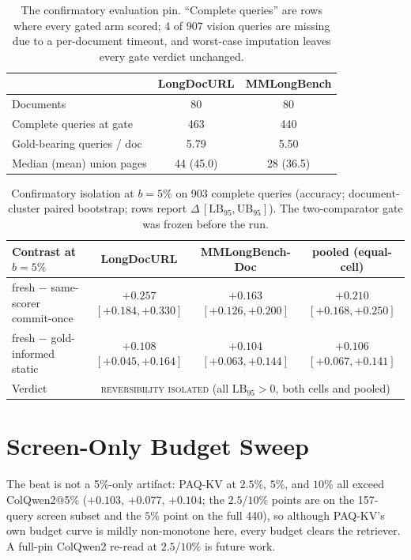 \documentclass[letterpaper]{article} %
\newcommand{\paqc}{\textsc{PAQ-KV}}
\newcommand{\lb}{\mathrm{LB}_{95}}
\begin{document}
\begin{table}[t]
\centering\small
\setlength{\tabcolsep}{4pt}%
\begin{tabular}{lcc}
\toprule
 & LongDocURL & MMLongBench \\
\midrule
Documents & 80 & 80 \\
Complete queries at gate & 463 & 440 \\
Gold-bearing queries / doc & 5.79 & 5.50 \\
Median (mean) union pages & 44 (45.0) & 28 (36.5) \\
\bottomrule
\end{tabular}
\caption{The confirmatory evaluation pin. ``Complete queries'' are rows where every gated arm scored; 4 of 907 vision queries are missing due to a per-document timeout, and worst-case imputation leaves every gate verdict unchanged.}
\label{tab:pins}
\end{table}

\begin{table}[t]
\centering\small
\begin{tabular}{lccc}
\toprule
Contrast at $b{=}5\%$ & LongDocURL & MMLongBench-Doc & pooled (equal-cell) \\
\midrule
fresh $-$ same-scorer commit-once & $+0.257$ $[+0.184,+0.330]$ & $+0.163$ $[+0.126,+0.200]$ & $+0.210$ $[+0.168,+0.250]$ \\
fresh $-$ gold-informed static & $+0.108$ $[+0.045,+0.164]$ & $+0.104$ $[+0.063,+0.144]$ & $+0.106$ $[+0.067,+0.141]$ \\
\midrule
Verdict & \multicolumn{3}{c}{\textsc{reversibility isolated} (all $\lb > 0$, both cells and pooled)} \\
\bottomrule
\end{tabular}
\caption{Confirmatory isolation at $b{=}5\%$ on 903 complete queries (accuracy; document-cluster paired bootstrap; rows report $\Delta\,[\lb,\mathrm{UB}_{95}]$). The two-comparator gate was frozen before the run.}
\label{tab:isolation}
\end{table}

\section{Screen-Only Budget Sweep}\label{app:budget-sweep}
The beat is not a 5\%-only artifact: \paqc{} at $2.5\%$, $5\%$, and $10\%$ all exceed ColQwen2@5\% ($+0.103$, $+0.077$, $+0.104$; the $2.5$/$10\%$ points are on the 157-query screen subset and the $5\%$ point on the full 440), so although \paqc{}'s own budget curve is mildly non-monotone here, every budget clears the retriever. A full-pin ColQwen2 re-read at $2.5$/$10\%$ is future work.
\end{document}
